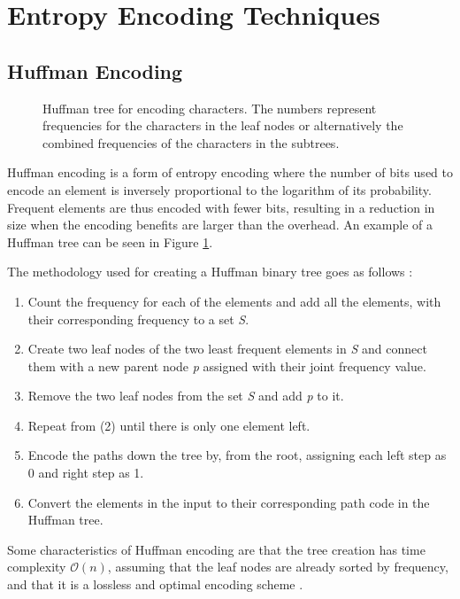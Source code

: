\section{Entropy Encoding Techniques}
\subsection{Huffman Encoding}
\label{section:huff}
\begin{figure}[htbp]
    \centering
    
    \caption{Huffman tree for encoding characters. The numbers represent frequencies for the characters in the leaf nodes or alternatively the combined frequencies of the characters in the subtrees.}
    \label{img:huff}
\end{figure}
Huffman encoding is a form of entropy encoding where the number of bits used to encode an element is inversely proportional to the logarithm of its probability. Frequent elements are thus encoded with fewer bits, resulting in a reduction in size when the encoding benefits are larger than the overhead. An example of a Huffman tree can be seen in Figure \ref{img:huff}.

The methodology used for creating a Huffman binary tree goes as follows \cite{Sharma2010CompressionUH}:

\begin{enumerate}
    \item Count the frequency for each of the elements and add all the elements, with their corresponding frequency to a set \textit{S}.
    \item Create two leaf nodes of the two least frequent elements in \textit{S} and connect them with a new parent node \textit{p} assigned with their joint frequency value.
    \item Remove the two leaf nodes from the set \textit{S} and add \textit{p} to it.
    \item Repeat from (2) until there is only one element left.
    \item Encode the paths down the tree by, from the root, assigning each left step as 0 and right step as 1.
    \item Convert the elements in the input to their corresponding path code in the Huffman tree.
\end{enumerate}

Some characteristics of Huffman encoding are that the tree creation has time complexity $\mathcal{O}(n)$, assuming that the leaf nodes are already sorted by frequency, and that it is a lossless and optimal encoding scheme \cite{Sharma2010CompressionUH}. 




